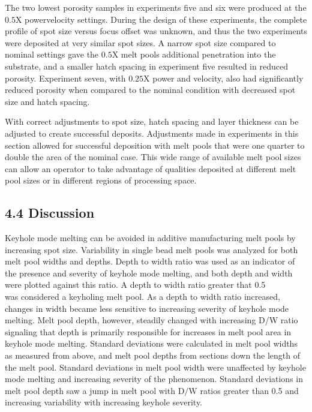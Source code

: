 \documentclass[10pt]{article}
\begin{document}
The two lowest porosity samples in experiments five and six were produced at the $0.5 \mathrm{X}$ powervelocity settings. During the design of these experiments, the complete profile of spot size versus focus offset was unknown, and thus the two experiments were deposited at very similar spot sizes. A narrow spot size compared to nominal settings gave the $0.5 \mathrm{X}$ melt pools additional penetration into the substrate, and a smaller hatch spacing in experiment five resulted in reduced porosity. Experiment seven, with $0.25 \mathrm{X}$ power and velocity, also had significantly reduced porosity when compared to the nominal condition with decreased spot size and hatch spacing.

With correct adjustments to spot size, hatch spacing and layer thickness can be adjusted to create successful deposits. Adjustments made in experiments in this section allowed for successful deposition with melt pools that were one quarter to double the area of the nominal case. This wide range of available melt pool sizes can allow an operator to take advantage of qualities deposited at different melt pool sizes or in different regions of processing space.

\subsection*{4.4 Discussion}
Keyhole mode melting can be avoided in additive manufacturing melt pools by increasing spot size. Variability in single bead melt pools was analyzed for both melt pool widths and depths. Depth to width ratio was used as an indicator of the presence and severity of keyhole mode melting, and both depth and width were plotted against this ratio. A depth to width ratio greater that 0.5\\
was considered a keyholing melt pool. As a depth to width ratio increased, changes in width became less sensitive to increasing severity of keyhole mode melting. Melt pool depth, however, steadily changed with increasing D/W ratio signaling that depth is primarily responsible for increases in melt pool area in keyhole mode melting. Standard deviations were calculated in melt pool widths as measured from above, and melt pool depths from sections down the length of the melt pool. Standard deviations in melt pool width were unaffected by keyhole mode melting and increasing severity of the phenomenon. Standard deviations in melt pool depth saw a jump in melt pool with $\mathrm{D} / \mathrm{W}$ ratios greater than 0.5 and increasing variability with increasing keyhole severity.
\end{document}
